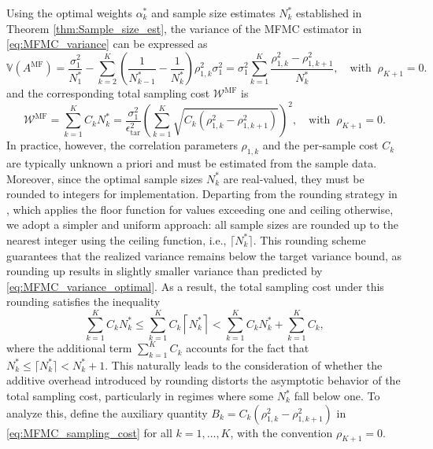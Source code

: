 Using the optimal weights $\alpha_k^*$ and sample size estimates $N_k^*$ established in Theorem \ref{thm:Sample_size_est}, the variance of the MFMC estimator in \eqref{eq:MFMC_variance} can be expressed as
%
\begin{equation}
\label{eq:MFMC_variance_optimal}
\mathbb{V}\left(A^{\text{MF}}\right) =\frac{\sigma_1^2}{N_1^*} - \sum_{k=2}^K \left(\frac{1}{N_{k-1}^*} - \frac{1}{N_k^*}\right)\rho_{1,k}^2\sigma_1^2=\sigma_1^2 \sum_{k=1}^K\frac{\rho_{1,k}^2 - \rho_{1,k+1}^2}{N_k^*},\quad \text{with}\;\;\rho_{K+1}=0.
\end{equation}
%
and the corresponding total sampling cost $\mathcal{W}^\text{MF}$ is
%
\begin{equation}\label{eq:MFMC_sampling_cost}
    \mathcal{W}^\text{MF} = \sum_{k=1}^K C_k N_k^* = \frac{\sigma_1^2}{\epsilon_{\text{tar}}^2}\left(\sum_{k=1}^K\sqrt{C_k\left(\rho_{1,k}^2 - \rho_{1,k+1}^2\right)}\right)^2,\quad \text{with}\;\;\rho_{K+1}=0.
\end{equation}
%
In practice, however, the correlation parameters $\rho_{1,k}$ and the per-sample cost $C_k$ are typically unknown a priori and must be estimated from the sample data. Moreover, since the optimal sample sizes $N_k^*$ are real-valued, they must be rounded to integers for implementation. Departing from the rounding strategy in \cite{GrGuJuWa:2023, PeWiGu:2016}, which applies the floor function for values exceeding one and ceiling otherwise, we adopt a simpler and uniform approach: all sample sizes are rounded up to the nearest integer using the ceiling function, i.e., $\lceil N_k^* \rceil$. This rounding scheme guarantees that the realized variance remains below the target variance bound, as rounding up results in slightly smaller variance than predicted by \eqref{eq:MFMC_variance_optimal}. As a result, the total sampling cost under this rounding satisfies the inequality
%
\begin{equation}\label{eq:sampling_cost_bound}
    \sum_{k=1}^K C_k N_k^*\le \sum_{k=1}^K C_k \left\lceil N_k^*\right\rceil<\sum_{k=1}^K C_k N_k^* + \sum_{k=1}^K C_k,
\end{equation}
%
where the additional term $\sum_{k=1}^K C_k$ accounts for the fact that $N_k^*\le \lceil N_k^*\rceil< N_k^*+1$. This naturally leads to the consideration of whether the additive overhead introduced by rounding distorts the asymptotic behavior of the total sampling cost, particularly in regimes where some $N_k^*$ fall below one. To analyze this, define the auxiliary quantity $B_k = C_k(\rho_{1,k}^2 - \rho_{1,k+1}^2)$ in \eqref{eq:MFMC_sampling_cost} for all $k=1,\dots, K$, with the convention $\rho_{K+1}=0$. 
